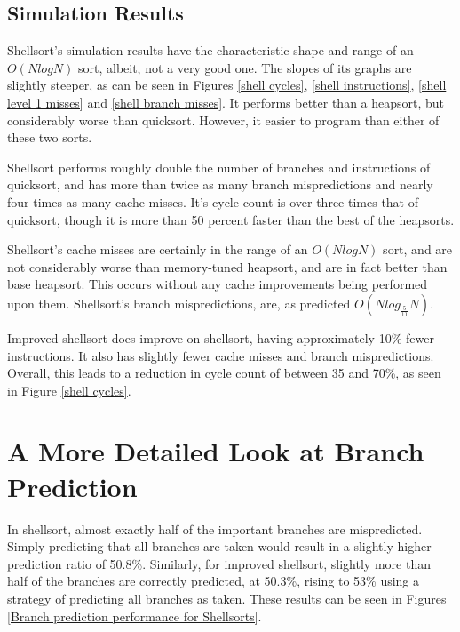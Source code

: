 \subsection{Simulation Results}

Shellsort's simulation results have the characteristic shape and range of an
$O(NlogN)$ sort, albeit, not a very good one. The slopes of its graphs are
slightly steeper, as can be seen in Figures \ref{shell cycles}, \ref{shell
instructions}, \ref{shell level 1 misses} and \ref{shell branch misses}. It
performs better than a heapsort, but considerably worse than quicksort. However,
it easier to program than either of these two sorts.

Shellsort performs roughly double the number of branches and instructions of
quicksort, and has more than twice as many branch mispredictions and nearly
four times as many cache misses. It's cycle count is over three times that of
quicksort, though it is more than 50 percent faster than the best of the
heapsorts.

Shellsort's cache misses are certainly in the range of an $O(NlogN)$ sort, and
are not considerably worse than memory-tuned heapsort, and are in fact better
than base heapsort. This occurs without any cache improvements being performed
upon them. Shellsort's branch mispredictions, are, as predicted
$O(Nlog_{\frac{5}{11}}N)$. 

Improved shellsort does improve on shellsort, having approximately 10\% fewer
instructions. It also has slightly fewer cache misses and branch mispredictions.
Overall, this leads to a reduction in cycle count of between 35 and 70\%, as
seen in Figure \ref{shell cycles}.

\section{A More Detailed Look at Branch Prediction}


In shellsort, almost exactly half of the important branches are mispredicted.
Simply predicting that all branches are taken would result in a slightly higher
prediction ratio of 50.8\%. Similarly, for improved shellsort, slightly more
than half of the branches are correctly predicted, at 50.3\%, rising to 53\%
using a strategy of predicting all branches as taken. These results can be seen
in Figures \ref{Branch prediction performance for Shellsorts}.

